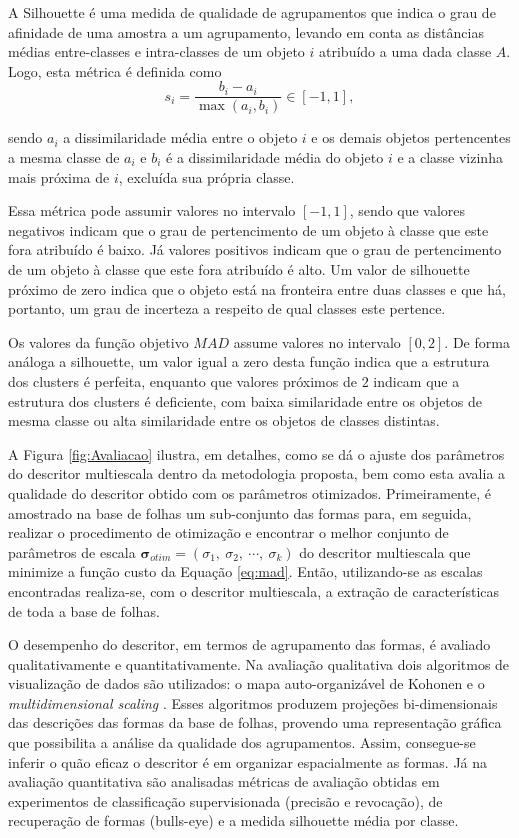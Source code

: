 A Silhouette \cite{Rousseeuw:1987} é uma medida de qualidade de agrupamentos que indica o grau de afinidade de uma amostra  a um agrupamento, levando em conta as distâncias médias entre-classes e intra-classes de um objeto $i$ atribuído a uma dada classe $A$. Logo, esta métrica é definida como 
\begin{equation}
s_i = \frac{b_i - a_i}{\max{(a_i,b_i)}} \in [-1,1],
\end{equation}

\noindent sendo $a_i$ a dissimilaridade média entre o objeto $i$ e os demais objetos pertencentes a mesma classe de $a_i$ e $b_i$ é a dissimilaridade média do objeto $i$ e a classe vizinha mais próxima de $i$, excluída sua própria classe. 

Essa métrica pode assumir valores no intervalo $[-1,1]$, sendo que valores negativos indicam que o grau de pertencimento de um objeto à classe que este fora atribuído é baixo. Já valores positivos indicam que o grau de pertencimento de um objeto à classe que este fora atribuído é alto. Um valor de silhouette próximo de zero indica que o objeto está na fronteira entre duas classes e que há, portanto, um grau de incerteza a respeito de qual classes este pertence.

Os valores da função objetivo $MAD$ assume valores no intervalo $[0,2]$. De forma análoga a silhouette, um valor igual a zero desta função indica que a estrutura dos clusters é perfeita, enquanto que valores próximos de $2$ indicam que a estrutura dos clusters é deficiente, com baixa similaridade entre os objetos de mesma classe ou alta similaridade entre os objetos de classes distintas.

A Figura  \ref{fig:Avaliacao} ilustra, em detalhes, como se dá o ajuste dos parâmetros do descritor multiescala dentro da metodologia proposta, bem como esta avalia a qualidade do descritor obtido com os parâmetros otimizados.  Primeiramente, é amostrado na base de folhas um sub-conjunto das formas para, em seguida, realizar o procedimento de otimização e encontrar o melhor conjunto de parâmetros de escala  $\boldsymbol{\sigma}_{otim} = (\sigma_1,\:\sigma_2,\:\cdots,\:\sigma_k)$ do descritor multiescala que minimize a função custo da Equação \ref{eq:mad}. Então, utilizando-se as escalas encontradas realiza-se, com o descritor multiescala, a extração de características de toda a base de folhas.

O desempenho do descritor, em termos de agrupamento das formas, é avaliado qualitativamente e quantitativamente. Na avaliação qualitativa dois algoritmos de visualização de dados são utilizados: o mapa auto-organizável de Kohonen \cite{Kohonen:2001} e o \textit{multidimensional scaling} \cite{cox:2000}. Esses algoritmos produzem projeções bi-dimensionais das descrições das formas da base de folhas, provendo uma representação gráfica que possibilita a análise da qualidade dos agrupamentos. Assim, consegue-se inferir o quão eficaz o descritor é em organizar espacialmente as formas. Já na avaliação quantitativa são analisadas métricas de avaliação obtidas em experimentos de classificação supervisionada (precisão e revocação), de recuperação de formas (bulls-eye) e a medida silhouette \cite{Rousseeuw:1987} média por classe. 

